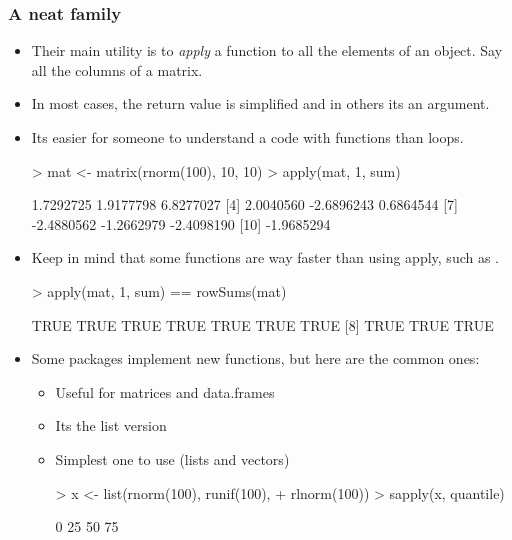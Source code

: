 \begin{frame}
  \frametitle{A neat family}
  \begin{itemize}
  \item Their main utility is to \emph{apply} a function to all the elements of an object. Say all the columns of a matrix.
  \item In most cases, the return value is simplified and in others its an argument.
  \item Its easier for someone to understand a code with  functions than  loops.
\begin{Schunk}
\begin{Sinput}
> mat <- matrix(rnorm(100), 10, 10)
> apply(mat, 1, sum)
\end{Sinput}
\begin{Soutput}
 [1]  1.7292725  1.9177798  6.8277027
 [4]  2.0040560 -2.6896243  0.6864544
 [7] -2.4880562 -1.2662979 -2.4098190
[10] -1.9685294
\end{Soutput}
\end{Schunk}
  \item Keep in mind that some  functions are way faster than using apply, such as .
\begin{Schunk}
\begin{Sinput}
> apply(mat, 1, sum) == rowSums(mat)
\end{Sinput}
\begin{Soutput}
 [1] TRUE TRUE TRUE TRUE TRUE TRUE TRUE
 [8] TRUE TRUE TRUE
\end{Soutput}
\end{Schunk}
  \item Some packages implement new  functions, but here are the common ones:
  \begin{itemize}
  \item {} Useful for matrices and data.frames
  \item {} Its the list version
  \item {} Simplest one to use (lists and vectors)
\begin{Schunk}
\begin{Sinput}
> x <- list(rnorm(100), runif(100), 
+     rlnorm(100))
> sapply(x, quantile)
\end{Sinput}
\begin{Soutput}
            [,1]         [,2]
0%
25%
50%
75%

\end{Soutput}
\end{Schunk}
\end{itemize}
\end{itemize}
\end{frame}

